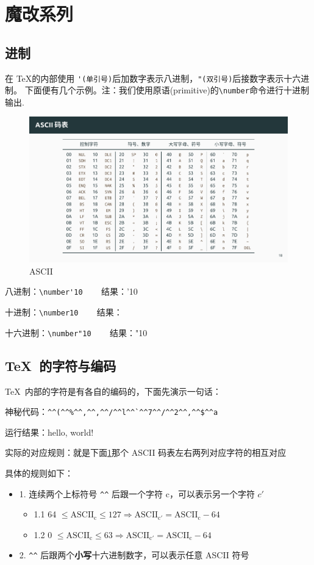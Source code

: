 \documentclass[fontset=windows, 12pt]{article}
\begin{document}
\section{魔改系列}
\subsection{进制}
在 \TeX 的内部使用  \verb |'(单引号)|后加数字表示八进制，\verb |"(双引号)|后接数字表示十六进制。
下面便有几个示例。注：我们使用原语(primitive)的\verb |\number|命令进行十进制输出.

\begin{figure}[!htb]
    \centering
    \includegraphics[scale=1]{ASCII.pdf}
    \caption{ASCII}
    \label{ASCII}
\end{figure}

八进制：\verb|\number'10| ~~~ 结果：\number'10

十进制：\verb|\number10| ~~~ 结果：

十六进制：\verb|\number"10| ~~~ 结果：\number"10

\subsection{\TeX\ 的字符与编码}
\TeX\ 内部的字符是有各自的编码的，下面先演示一句话：

神秘代码：\verb |^^(^^%

运行结果：^^(^^%

实际的对应规则：就是下面\ref{ASCII}那个 ASCII 码表左右两列对应字符的相互对应

具体的规则如下：

\begin{itemize}
    \item 1. 连续两个上标符号 \verb|^^| 后跟一个字符 c，可以表示另一个字符 \ensuremath{c'}
    \begin{itemize}
        \item 1.1 64 $\mathrm {\le ASCII_c \le 127 \Rightarrow ASCII_{c'} = ASCII_c - 64}$
        \item 1.2 0 $\mathrm {\le ASCII_c \le 63 \Rightarrow ASCII_{c'} = ASCII_c - 64}$
    \end{itemize}
    \item 2. \verb |^^| 后跟两个{\bf 小写}十六进制数字，可以表示任意 ASCII 符号
\end{itemize}
\end{document}
